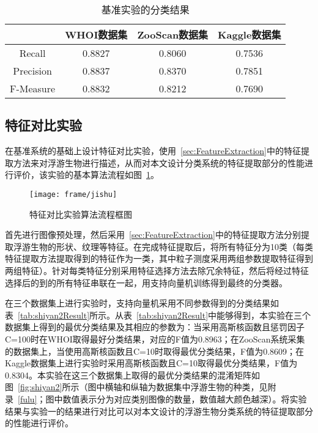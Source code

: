 \begin{table}[htbp]
\small
  \centering
  \caption{基准实验的分类结果}
  \label{tab:shiyan1Result}
  \begin{tabular}[c]{cccc}
    \toprule
    ~ & WHOI数据集 & ZooScan数据集 & Kaggle数据集\\
    \midrule
    Recall & 0.8827 & 0.8060 & 0.7536\\
    Precision & 0.8837 & 0.8370 & 0.7851\\
    F-Measure & 0.8832 & 0.8212 & 0.7690\\
    \bottomrule
  \end{tabular}
\end{table}

\subsection{特征对比实验}
\label{sec:featureexperiment}

在基准系统的基础上设计特征对比实验，使用~\ref{sec:FeatureExtraction}中的特征提取方法来对浮游生物进行描述，从而对本文设计分类系统的特征提取部分的性能进行评价，该实验的基本算法流程如图~\ref{fig:shiyan2frame}。
\begin{figure}[htbp] %
  \centering
  \texttt{[image: frame/jishu]}
  \caption{特征对比实验算法流程框图}
  \label{fig:shiyan2frame}
\end{figure}

首先进行图像预处理，然后采用~\ref{sec:FeatureExtraction}中的特征提取方法分别提取浮游生物的形状、纹理等特征。在完成特征提取后，将所有特征分为10类（每类特征提取方法提取得到的特征作为一类，其中粒子测度采用两组参数提取特征得到两组特征）。针对每类特征分别采用特征选择方法去除冗余特征，然后将经过特征选择后的到的所有特征串联在一起，用支持向量机训练得到最终的分类器。

在三个数据集上进行实验时，支持向量机采用不同参数得到的分类结果如表~\ref{tab:shiyan2Result}所示。从表~\ref{tab:shiyan2Result}中能够得到，本实验在三个数据集上得到的最优分类结果及其相应的参数为：当采用高斯核函数且惩罚因子C=100时在WHOI取得最好分类结果，对应的F值为0.8963；在ZooScan系统采集的数据集上，当使用高斯核函数且C=10时取得最优分类结果，F值为0.8609；在Kaggle数据集上进行实验时采用高斯核函数且C=10取得最优分类结果，F值为0.8304。本实验在这三个数据集上取得的最优分类结果的混淆矩阵如图~\ref{fig:shiyan2}所示（图中横轴和纵轴为数据集中浮游生物的种类，见附录~\ref{fulu}；图中数值表示分为对应类别图像的数量，数值越大颜色越深）。将实验结果与实验一的结果进行对比可以对本文设计的浮游生物分类系统的特征提取部分的性能进行评价。

